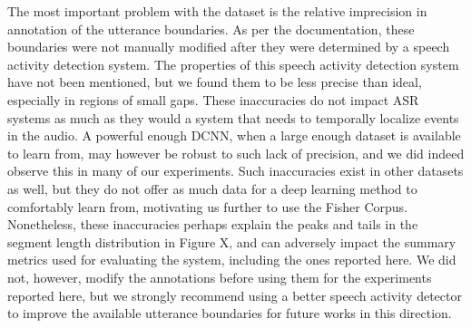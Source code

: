 \documentclass[a4paper]{article}
\begin{document}
The most important problem with the dataset is the relative imprecision in annotation of the utterance boundaries.
As per the documentation,
these boundaries were not manually modified after they were determined by a speech activity detection system.   %
The properties of this speech activity detection system have not been mentioned,
but we found them to be less precise than ideal, especially in regions of small gaps.
These inaccuracies do not impact ASR systems as much as they would a system that needs to temporally localize events in the audio.
A powerful enough DCNN, when a large enough dataset is available to learn from,
may however be robust to such lack of precision,
and we did indeed observe this in many of our experiments.
Such inaccuracies exist in other datasets as well,
but they do not offer as much data for a deep learning method to comfortably learn from,
motivating us further to use the Fisher Corpus.
Nonetheless, these inaccuracies perhaps explain the peaks and tails in the segment length distribution in Figure X,  %
and can adversely impact the summary metrics used for evaluating the system, including the ones reported here.
We did not, however, modify the annotations before using them for the experiments reported here,
but we strongly recommend using a better speech activity detector to improve the available utterance boundaries for future works in this direction.

\end{document}
